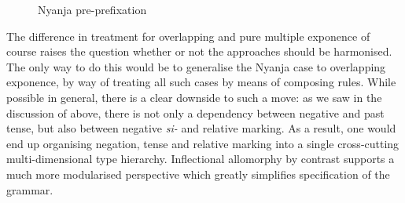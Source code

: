 \documentclass[output=paper
	        ,collection
	        ,collectionchapter
 	        ,biblatex
                ,babelshorthands
                ,newtxmath
                ,draftmode
                ,colorlinks, citecolor=brown
]{langscibook}
\begin{document}
\begin{exe}
\begin{xlist}
\begin{exe}
\begin{xlist}
\begin{figure}
  \centering
{}    
  \caption{Nyanja pre-prefixation \citep[210]{Crysmann:14:OUP}}\label{fig:Nyanja}
\end{figure}

The difference in treatment for overlapping and pure multiple
exponence of course raises the question whether or not the approaches
should be harmonised. The only way to do this would be to generalise
the Nyanja case to overlapping exponence, by way of treating all such
cases by means of composing rules. While possible in general, there is
a clear downside to such a move: as we saw in the discussion of
 above, there is not only a dependency between negative and
past tense, but also between negative \textit{si-} and relative
marking. As a result, one would end up organising negation, tense and
relative marking into a single cross-cutting multi-dimensional type
hierarchy. Inflectional allomorphy by contrast supports a much more
modularised perspective which greatly simplifies specification of the
grammar.  


\end{xlist}
\end{exe}
\end{xlist}
\end{exe}
\end{document}
